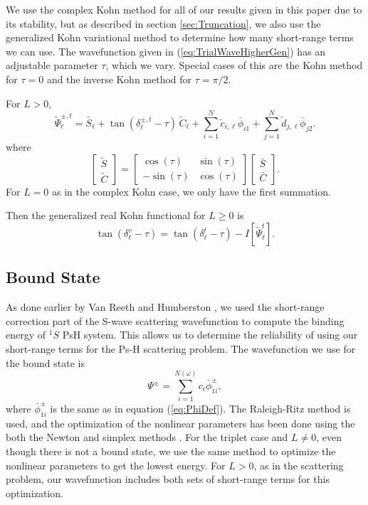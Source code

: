 \documentclass[preprint,showpacs,preprintnumbers,amsmath,amssymb]{revtex4}
\begin{document}
We use the complex Kohn method for all of our results given in this paper due to its stability, but as described in section \ref{sec:Truncation}, we also use the generalized Kohn variational method \cite{Cooper2010} to determine how many short-range terms we can use. The wavefunction given in (\ref{eq:TrialWaveHigherGen}) has an adjustable parameter $\tau$, which we vary. Special cases of this are the Kohn method for $\tau = 0$ and the inverse Kohn method for $\tau = \pi/2$.

For $L > 0$,
\begin{equation}
\widetilde{\Psi}_\ell^{\pm,t} = \widetilde{S_\ell} + \tan(\delta^{\pm,t}_\ell - \tau) \, \widetilde{C}_\ell + \sum_{i=1}^N \widetilde{c}_{i,\ell} \bar{\phi}_{i1} + \sum_{j=1}^N \widetilde{d}_{j,\ell} \bar{\phi}_{j2}.
\label{eq:TrialWaveHigherGen}
\end{equation}
where
\begin{equation}
\begin{bmatrix}
\widetilde{S} \\
\widetilde{C}
\end{bmatrix}
=
\begin{bmatrix}
\cos(\tau) & \sin(\tau) \\
-\sin(\tau) & \cos(\tau)
\end{bmatrix}
\begin{bmatrix}
\bar{S} \\
\bar{C}
\end{bmatrix}.
\end{equation}
For $L = 0$ as in the complex Kohn case, we only have the first summation.

Then the generalized real Kohn functional for $L \geq 0$ is
\begin{equation}
\tan(\delta^{v}_\ell - \tau) = \tan(\delta^{t}_\ell - \tau) - I\left[\widetilde{\Psi}_\ell^{t}\right].
\label{eq:GenKohnVariation}
\end{equation}


\subsection{Bound State}
As done earlier by Van Reeth and Humberston \cite{VanReeth2003,VanReeth2004}, we used the short-range correction part of the S-wave scattering wavefunction to compute the binding energy of $^1S$ PsH system. This allows us to determine the reliability of using our short-range terms for the Ps-H scattering problem. The wavefunction we use for the bound state is
\begin{equation}
\label{eq:BoundWavefn}
\Psi^\pm = \sum_{i=1}^{N(\omega)} c_i \bar{\phi}_{1i}^\pm,
\end{equation}
where $\bar{\phi}_{1i}^\pm$ is the same as in equation (\ref{eq:PhiDef}). The Raleigh-Ritz method is used, and the optimization of the nonlinear parameters has been done using the both the Newton and simplex methods \cite{Yan1999,GSL}. For the triplet case and $L \neq 0$, even though there is not a bound state, we use the same method to optimize the nonlinear parameters to get the lowest energy. For $L > 0$, as in the scattering problem, our wavefunction includes both sets of short-range terms for this optimization.
\end{document}
